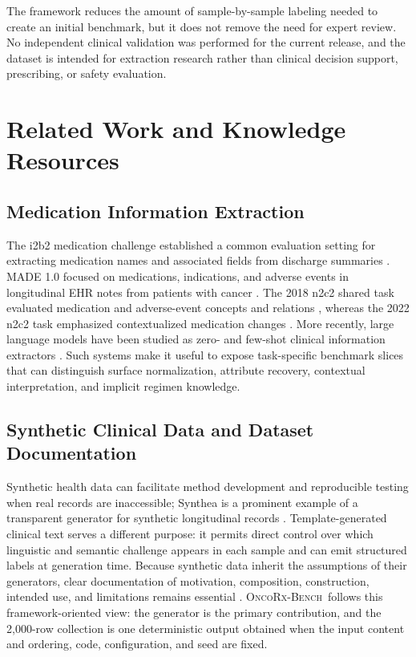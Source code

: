\documentclass[conference]{IEEEtran}
\newcommand{\dataset}{\textsc{OncoRx-Bench}}
\begin{document}
The framework reduces the amount of sample-by-sample labeling needed to create
an initial benchmark, but it does not remove the need for expert review. No
independent clinical validation was performed for the current release, and the
dataset is intended for extraction research rather than clinical decision
support, prescribing, or safety evaluation.

\section{Related Work and Knowledge Resources}
\label{sec:related}

\subsection{Medication Information Extraction}

The i2b2 medication challenge established a common evaluation setting for
extracting medication names and associated fields from discharge summaries
\cite{uzuner2010}. MADE 1.0 focused on medications, indications, and adverse
events in longitudinal EHR notes from patients with cancer
\cite{jagannatha2019}. The 2018 n2c2
shared task evaluated medication and adverse-event concepts and relations
\cite{henry2020}, whereas the 2022 n2c2 task emphasized contextualized
medication changes \cite{mahajan2023}. More recently, large language models
have been studied as zero- and few-shot clinical information extractors
\cite{agrawal2022}. Such systems make it useful to expose task-specific
benchmark slices that can distinguish surface normalization, attribute
recovery, contextual interpretation, and implicit regimen knowledge.

\subsection{Synthetic Clinical Data and Dataset Documentation}

Synthetic health data can facilitate method development and reproducible
testing when real records are inaccessible; Synthea is a prominent example of
a transparent generator for synthetic longitudinal records
\cite{walonoski2018}. Template-generated clinical text serves a different
purpose: it permits direct control over which linguistic and semantic challenge
appears in each sample and can emit structured labels at generation time.
Because synthetic data inherit the assumptions of their generators, clear
documentation of motivation, composition, construction, intended use, and
limitations remains essential \cite{gebru2021}. \dataset\ follows this
framework-oriented view: the generator is the primary contribution, and the
2,000-row collection is one deterministic output obtained when the input
content and ordering, code, configuration, and seed are fixed.
\end{document}
